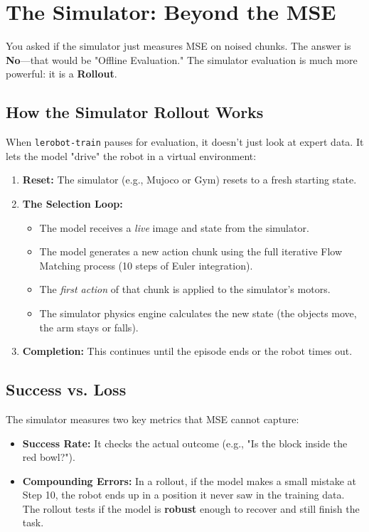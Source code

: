 \documentclass[11pt,a4paper]{article}
\begin{document}
\section{The Simulator: Beyond the MSE}
You asked if the simulator just measures MSE on noised chunks. The answer is \textbf{No}—that would be "Offline Evaluation." The simulator evaluation is much more powerful: it is a \textbf{Rollout}.

\subsection{How the Simulator Rollout Works}
When \texttt{lerobot-train} pauses for evaluation, it doesn't just look at expert data. It lets the model "drive" the robot in a virtual environment:
\begin{enumerate}
    \item \textbf{Reset:} The simulator (e.g., Mujoco or Gym) resets to a fresh starting state.
    \item \textbf{The Selection Loop:} 
    \begin{itemize}
        \item The model receives a \textit{live} image and state from the simulator.
        \item The model generates a new action chunk using the full iterative Flow Matching process (10 steps of Euler integration).
        \item The \textit{first action} of that chunk is applied to the simulator's motors.
        \item The simulator physics engine calculates the new state (the objects move, the arm stays or falls).
    \end{itemize}
    \item \textbf{Completion:} This continues until the episode ends or the robot times out.
\end{enumerate}

\subsection{Success vs. Loss}
The simulator measures two key metrics that MSE cannot capture:
\begin{itemize}
    \item \textbf{Success Rate:} It checks the actual outcome (e.g., "Is the block inside the red bowl?").
    \item \textbf{Compounding Errors:} In a rollout, if the model makes a small mistake at Step 10, the robot ends up in a position it never saw in the training data. The rollout tests if the model is \textbf{robust} enough to recover and still finish the task.
\end{itemize}
\end{document}

